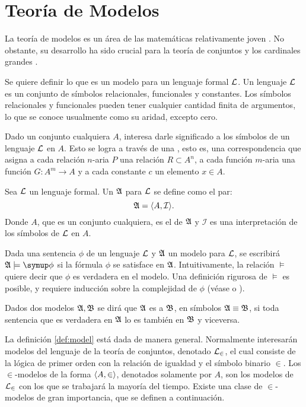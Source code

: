 \documentclass
[
  12pt,
  letterpaper,
  openany,
  oneside,
]{book}
\begin{document}
\section{Teoría de Modelos}
\label{sec:models}

La teoría de modelos es un área de las matemáticas
relativamente joven \autocite[3]{chang_model_2012}.
No obstante, su desarrollo ha sido crucial para la teoría de conjuntos y los
cardinales grandes \autocite[xv]{kanamori_higher_2009}.

Se quiere definir lo que es un modelo para un lenguaje formal $\mathcal { L }$.
Un lenguaje $\mathcal { L }$ es un conjunto de símbolos relacionales, funcionales y constantes.
Los símbolos relacionales y funcionales pueden tener cualquier cantidad finita de argumentos,
lo que se conoce usualmente como su aridad, excepto cero.

Dado un conjunto cualquiera $A$, interesa darle significado a los símbolos de un
lenguaje $\mathcal { L }$ en $A$. Esto se logra a través de una , esto es,
una correspondencia que asigna a cada relación $n$-aria $P$ una relación
$R\subset A^n$, a cada función $m$-aria una función $G\colon A^m\to A$ y a cada
constante $c$ un elemento $x\in A$.

\begin{defi}\label{def:model}
    Sea $\mathcal { L }$ un lenguaje formal. Un  $\mathfrak { A }$ para $\mathcal { L }$ se define como el par:
    \[
        \mathfrak { A } = \langle A, \mathcal{I} \rangle.
    \]
    Donde $A$, que es un conjunto cualquiera, es el  de $\mathfrak { A }$ y
    $\mathcal{I}$ es una interpretación de los símbolos de $\mathcal { L }$ en $A$.
\end{defi}

Dada una sentencia $\phi$ de un lenguaje $\mathcal { L }$ y $\mathfrak { A }$ un modelo para $\mathcal { L }$,
se escribirá $\model{A}\models\phi$ si la fórmula $\phi$ se satisface en $\mathfrak { A }$.
Intuitivamente, la relación $\models$ quiere decir que $\phi$ es verdadera en el modelo.
Una definición rigurosa de $\models$ es posible, y requiere inducción sobre la complejidad
de $\phi$ (véase \autocite[\S 1.3]{chang_model_2012} o \autocite[\S 12]{jech_set_2003}).

Dados dos modelos $\mathfrak { A }, \mathfrak { B }$ se dirá que $\mathfrak { A }$ es  a $\mathfrak { B }$, en símbolos $\mathfrak { A }\equiv \mathfrak { B }$, si toda sentencia
que es verdadera en $\mathfrak { A }$ lo es también en $\mathfrak { B }$ y viceversa.

La definición \ref{def:model} está dada de manera general. Normalmente interesarán modelos
del lenguaje de la teoría de conjuntos, denotado $\mathcal { L }_\in$, el cual consiste de la lógica de
primer orden con la relación de igualdad y el símbolo binario $\in$.
Los $\in$-modelos de la forma $\langle A,\in \rangle$, denotados
solamente por $A$, son los modelos de $\mathcal { L }_\in$ con los que se trabajará la mayoría del tiempo.
Existe una clase de $\in$-modelos de gran importancia, que se definen a continuación.
\end{document}

